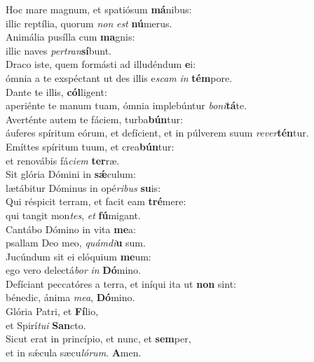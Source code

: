 \evenverse Hoc mare magnum, et spatiósum \textbf{má}nibus:~\*\\
\evenverse illic reptília, quorum \textit{non} \textit{est} \textbf{nú}merus.\\
\oddverse Animália pusílla cum \textbf{ma}gnis:~\*\\
\oddverse illic naves \textit{per}\textit{tran}\textbf{sí}bunt.\\
\evenverse Draco iste, quem formásti ad illudéndum \textbf{e}i:~\*\\
\evenverse ómnia a te exspéctant ut des illis e\textit{scam} \textit{in} \textbf{tém}pore.\\
\oddverse Dante te illis, \textbf{cól}ligent:~\*\\
\oddverse aperiénte te manum tuam, ómnia implebúntur \textit{bo}\textit{ni}\textbf{tá}te.\\
\evenverse Averténte autem te fáciem, turba\textbf{bún}tur:~\*\\
\evenverse áuferes spíritum eórum, et defícient, et in púlverem suum \textit{re}\textit{ver}\textbf{tén}tur.\\
\oddverse Emíttes spíritum tuum, et crea\textbf{bún}tur:~\*\\
\oddverse et renovábis fá\textit{ci}\textit{em} \textbf{ter}ræ.\\
\evenverse Sit glória Dómini in \textbf{sǽ}culum:~\*\\
\evenverse lætábitur Dóminus in opé\textit{ri}\textit{bus} \textbf{su}is:\\
\oddverse Qui réspicit terram, et facit eam \textbf{tré}mere:~\*\\
\oddverse qui tangit mon\textit{tes}, \textit{et} \textbf{fú}migant.\\
\evenverse Cantábo Dómino in vita \textbf{me}a:~\*\\
\evenverse psallam Deo meo, \textit{quám}\textit{di}\textbf{u} sum.\\
\oddverse Jucúndum sit ei elóquium \textbf{me}um:~\*\\
\oddverse ego vero delectá\textit{bor} \textit{in} \textbf{Dó}mino.\\
\evenverse Defíciant peccatóres a terra, et iníqui ita ut \textbf{non} sint:~\*\\
\evenverse bénedic, ánima \textit{me}\textit{a}, \textbf{Dó}mino.\\
\oddverse Glória Patri, et \textbf{Fí}lio,~\*\\
\oddverse et Spirí\textit{tu}\textit{i} \textbf{San}cto.\\
\evenverse Sicut erat in princípio, et nunc, et \textbf{sem}per,~\*\\
\evenverse et in sǽcula sæcu\textit{ló}\textit{rum}. \textbf{A}men.\\
